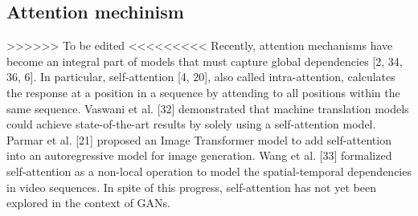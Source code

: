 \subsection{Attention mechinism}
>>>>>> To be edited <<<<<<<<<
Recently, attention mechanisms have become an integral part of models that must capture global dependencies [2, 34, 36, 6]. In particular, self-attention [4, 20], also called intra-attention, calculates the response at a position in a sequence by attending to all positions within the same sequence. Vaswani et al. [32] demonstrated that machine translation models could achieve state-of-the-art results by solely using a self-attention model. Parmar et al. [21] proposed an Image Transformer model to add self-attention into an autoregressive model for image generation. Wang et al. [33] formalized self-attention as a non-local operation to model the spatial-temporal dependencies in video sequences. In spite of this progress, self-attention has not yet been explored in the context of GANs. 